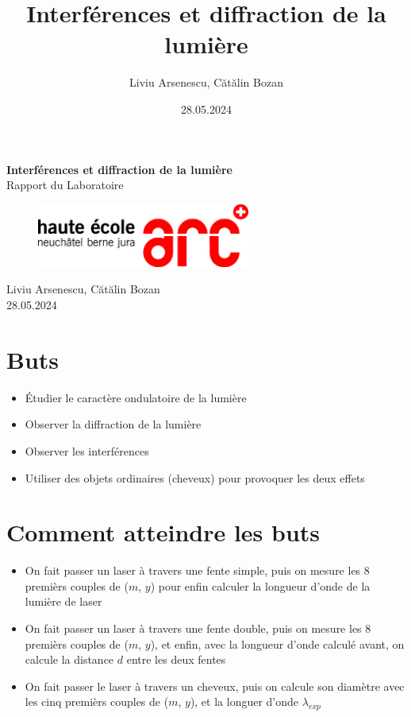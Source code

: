 \documentclass[12pt,a4paper]{article}
\title{Interférences et diffraction de la lumière}
\author{Liviu Arsenescu, Cătălin Bozan}
\date{28.05.2024}
\begin{document}
    \begin{titlepage}
        \begin{center}
            \vspace*{\fill}
            \Huge \textbf{Interférences et diffraction de la lumière} \\
            \Large Rapport du Laboratoire \\
            \begin{figure}[h]
                \centering
                \includegraphics[width=7cm]{hearclogo.png}
            \end{figure}
            \vspace{\fill}
            \Large Liviu Arsenescu, Cătălin Bozan \\
            28.05.2024

            \vspace*{\fill}
        \end{center}
    \end{titlepage}

    \section{Buts}
    \begin{itemize}
        \item Étudier le caractère ondulatoire de la lumière
        \item Observer la diffraction de la lumière
        \item Observer les interférences
        \item Utiliser des objets ordinaires (cheveux) pour provoquer les deux effets
    \end{itemize}
    \section{Comment atteindre les buts}
    \begin{itemize}
        \item On fait passer un laser à travers une fente simple, puis on mesure les 8 premièrs couples de ($m$, $y$) pour enfin calculer la longueur d'onde de la lumière de laser
        \item On fait passer un laser à travers une fente double, puis on mesure les 8 premièrs couples de ($m$, $y$), et enfin, avec la longueur d'onde calculé avant, on calcule la distance $d$ entre les deux fentes
        \item On fait passer le laser à travers un cheveux, puis on calcule son diamètre avec les cinq premièrs couples de ($m$, $y$), et la longuer d'onde $\lambda_{exp}$ 
    \end{itemize}
\end{document}
